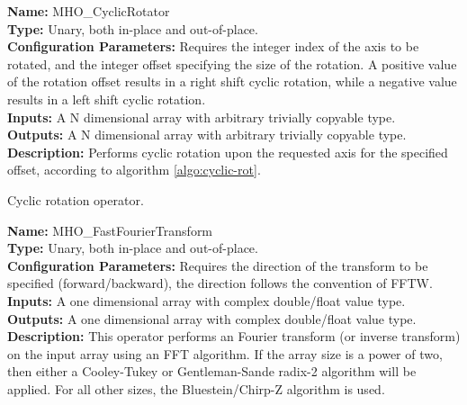 \noindent \textbf{Name:} MHO\_CyclicRotator \\
\textbf{Type:} Unary, both in-place and out-of-place. \\
\textbf{Configuration Parameters:} Requires the integer index of the axis to be rotated, and the integer offset specifying the size of the rotation. A positive value of the rotation offset results in a right shift cyclic rotation, while a negative value results in a left shift cyclic rotation.\\
\textbf{Inputs:} A N dimensional array with arbitrary trivially copyable type. \\
\textbf{Outputs:} A N dimensional array with arbitrary trivially copyable type. \\
\textbf{Description:} Performs cyclic rotation upon the requested axis for the specified offset, according to algorithm \ref{algo:cyclic-rot}.

\begin{algorithm}[h!]
  \caption{Cyclic rotation operator.}
    \begin{algorithmic}[1]
    \end{algorithmic}
  \label{algo:cyclic-rot}
\end{algorithm}



\noindent \textbf{Name:} MHO\_FastFourierTransform \\
\textbf{Type:} Unary, both in-place and out-of-place. \\
\textbf{Configuration Parameters:} Requires the direction of the transform to be specified (forward/backward), the direction follows the convention of FFTW.\\
\textbf{Inputs:} A one dimensional array with complex double/float value type. \\
\textbf{Outputs:} A one dimensional array with complex double/float value type. \\
\textbf{Description:} This operator performs an Fourier transform (or inverse transform) on the input array using an FFT algorithm. If the array size is a power of two, then either a Cooley-Tukey or Gentleman-Sande radix-2 algorithm will be applied. For all other sizes, the Bluestein/Chirp-Z algorithm is used.\\



